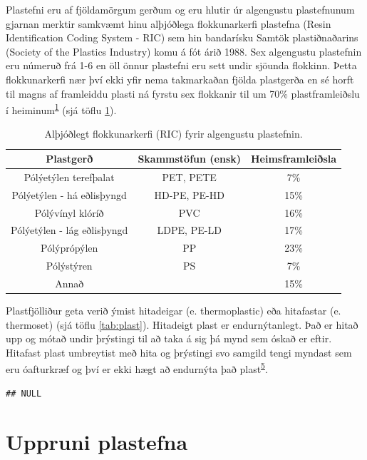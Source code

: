 \documentclass[icelandic,]{book}
\begin{document}
Plastefni eru af fjöldamörgum gerðum og eru hlutir úr algengustu plastefnunum gjarnan merktir samkvæmt hinu alþjóðlega flokkunarkerfi plastefna (Resin Identification Coding System - RIC) sem hin bandarísku Samtök plastiðnaðarins (Society of the Plastics Industry) komu á fót árið 1988. Sex algengustu plastefnin eru númeruð frá 1-6 en öll önnur plastefni eru sett undir sjöunda flokkinn. Þetta flokkunarkerfi nær því ekki yfir nema takmarkaðan fjölda plastgerða en sé horft til magns af framleiddu plasti ná fyrstu sex flokkanir til um 70\% plastframleiðslu í heiminum\textsuperscript{\protect\hyperlink{ref-geyer2017production}{1}} (sjá töflu \ref{tab:framleidsla}).

\begin{table}[t]

\caption{\label{tab:framleidsla}Alþjóðlegt flokkunarkerfi (RIC) fyrir algengustu plastefnin.}
\centering
\begin{tabular}{ccc}
\toprule
Plastgerð & Skammstöfun (ensk) & Heimsframleiðsla\\
\midrule
Pólýetýlen terefþalat & PET, PETE & 7\%\\
Pólýetýlen - há eðlisþyngd & HD-PE, PE-HD & 15\%\\
Pólývínyl klóríð & PVC & 16\%\\
Pólýetýlen - lág eðlisþyngd & LDPE, PE-LD & 17\%\\
Pólýprópýlen & PP & 23\%\\
\addlinespace
Pólýstýren & PS & 7\%\\
Annað &  & 15\%\\
\bottomrule
\end{tabular}
\end{table}

Plastfjölliður geta verið ýmist hitadeigar (e. thermoplastic) eða hitafastar (e. thermoset) (sjá töflu \ref{tab:plast}). Hitadeigt plast er endurnýtanlegt. Það er hitað upp og mótað undir þrýstingi til að taka á sig þá mynd sem óskað er eftir. Hitafast plast umbreytist með hita og þrýstingi svo samgild tengi myndast sem eru óafturkræf og því er ekki hægt að endurnýta það plast\textsuperscript{\protect\hyperlink{ref-OECD2009}{5}}.

\begin{verbatim}
## NULL
\end{verbatim}

\hypertarget{uppruni-plastefna}{%
\section*{Uppruni plastefna}\label{uppruni-plastefna}}
\end{document}
